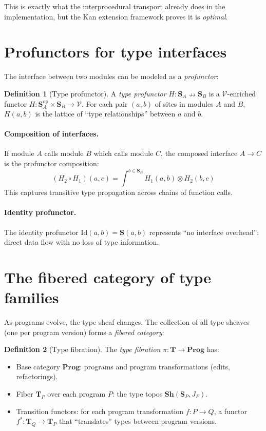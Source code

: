 \documentclass[11pt]{report}
\theoremstyle{definition}
\newtheorem{definition}{Definition}[section]
\theoremstyle{plain}
\begin{document}
This is exactly what the interprocedural transport already does in the
implementation, but the Kan extension framework proves it is \emph{optimal}.

\section{Profunctors for type interfaces}

The interface between two modules can be modeled as a \emph{profunctor}:

\begin{definition}[Type profunctor]
A \emph{type profunctor} $H : \mathbf{S}_A \nrightarrow \mathbf{S}_B$ is a
$\mathcal{V}$-enriched functor
$H : \mathbf{S}_A^{\mathrm{op}} \times \mathbf{S}_B \to \mathcal{V}$.
For each pair $(a, b)$ of sites in modules $A$ and $B$, $H(a, b)$ is the
lattice of ``type relationships'' between $a$ and $b$.
\end{definition}

\paragraph{Composition of interfaces.}
If module $A$ calls module $B$ which calls module $C$, the composed interface
$A \to C$ is the profunctor composition:
\[
  (H_2 \circ H_1)(a, c) = \int^{b \in \mathbf{S}_B}
    H_1(a, b) \otimes H_2(b, c)
\]
This captures transitive type propagation across chains of function calls.

\paragraph{Identity profunctor.}
The identity profunctor $\mathrm{Id}(a, b) = \mathbf{S}(a, b)$ represents
``no interface overhead'': direct data flow with no loss of type information.

\section{The fibered category of type families}

As programs evolve, the type sheaf changes. The collection of all type
sheaves (one per program version) forms a \emph{fibered category}:

\begin{definition}[Type fibration]
The \emph{type fibration} $\pi : \mathbf{T} \to \mathbf{Prog}$ has:
\begin{itemize}[nosep]
  \item Base category $\mathbf{Prog}$: programs and program transformations
        (edits, refactorings).
  \item Fiber $\mathbf{T}_P$ over each program $P$: the type topos
        $\mathbf{Sh}(\mathbf{S}_P, J_P)$.
  \item Transition functors: for each program transformation $f : P \to Q$,
        a functor $f^* : \mathbf{T}_Q \to \mathbf{T}_P$ that ``translates''
        types between program versions.
\end{itemize}
\end{definition}
\end{document}
